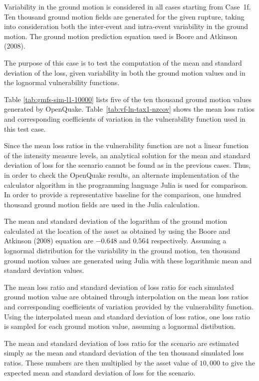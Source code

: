 Variability in the ground motion is considered in all cases starting from Case~1f. Ten thousand ground motion fields are generated for the given rupture, taking into consideration both the inter-event and intra-event variability in the ground motion. The ground motion prediction equation used is Boore and Atkinson (2008).

The purpose of this case is to test the computation of the mean and standard deviation of the loss, given variability in both the ground motion values and in the lognormal vulnerability functions.



Table \ref{tab:gmfs-sim-l1-10000} lists five of the ten thousand ground motion values generated by OpenQuake. Table~\ref{tab:vf-ln-tax1-nzcov} shows the mean loss ratios and corresponding coefficients of variation in the vulnerability function used in this test case.

Since the mean loss ratios in the vulnerability function are not a linear function of the intensity measure levels, an analytical solution for the mean and standard deviation of loss for the scenario cannot be found as in the previous cases. Thus, in order to check the OpenQuake results, an alternate implementation of the calculator algorithm in the programming language Julia is used for comparison. In order to provide a representative baseline for the comparison, one hundred thousand ground motion fields are used in the Julia calculation.

The mean and standard deviation of the logarithm of the ground motion calculated at the location of the asset as obtained by using the Boore and Atkinson (2008) equation are $-0.648$ and $0.564$ respectively. Assuming a lognormal distribution for the variability in the ground motion, ten thousand ground motion values are generated using Julia with these logarithmic mean and standard deviation values.

The mean loss ratio and standard deviation of loss ratio for each simulated ground motion value are obtained through interpolation on the mean loss ratios and corresponding coefficients of variation provided by the vulnerability function. Using the interpolated mean and standard deviation of loss ratios, one loss ratio is sampled for each ground motion value, assuming a lognormal distibution.

The mean and standard deviation of loss ratio for the scenario are estimated simply as the mean and standard deviation of the ten thousand simulated loss ratios. These numbers are then multiplied by the asset value of $10,000$ to give the expected mean and standard deviation of loss for the scenario.